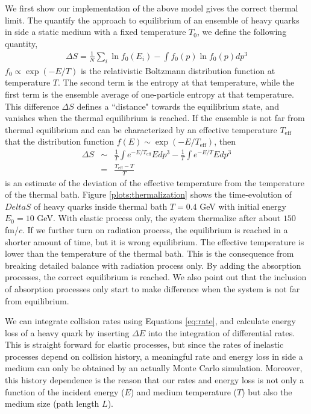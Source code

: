 \documentclass[aps, prc, reprint, amsmath, groupedaddress, nofootinbib]{revtex4-1}
\begin{document}
We first show our implementation of the above model gives the correct thermal limit. 
The quantify the approach to equilibrium of an ensemble of heavy quarks in side a static medium with a fixed temperature $T_0$, we define the following quantity,
\begin{eqnarray}
\Delta S = \frac{1}{N}\sum_i \ln f_0(E_i) - \int f_0(p)\ln f_0(p) dp^3
\end{eqnarray}
$f_0 \propto \exp(-E/T)$ is the relativistic Boltzmann distribution function at temperature $T$. 
The second term is the entropy at that temperature, while the first term is the ensemble average of one-particle entropy at that temperature.
This difference $\Delta S$ defines a ``distance" towards the equilibrium state, and vanishes when the thermal equilibrium is reached.
If the ensemble is not far from thermal equilibrium and can be characterized by an effective temperature $T_{\textrm{eff}}$ that the distribution function $f(E)\sim \exp(-E/T_{\textrm{eff}})$, then
\begin{eqnarray}
\nonumber
\Delta S &\sim& \frac{1}{T}\int  e^{-E/T_{\textrm{eff}}} E dp^3 - \frac{1}{T}\int e^{-E/T} E dp^3 \\
&=& \frac{T_\textrm{eff}-T}{T}
\end{eqnarray}
is an estimate of the deviation of the effective temperature from the temperature of the thermal bath.
Figure \ref{plots:thermalization} shows the time-evolution of $Delta S$ of heavy quarks inside thermal bath $T=0.4$ GeV with initial energy $E_0 = 10$ GeV.
With elastic process only, the system thermalize after about $150$ fm/$c$.
If we further turn on radiation process, the equilibrium is reached in a shorter amount of time, but it is wrong equilibrium.
The effective temperature is lower than the temperature of the thermal bath.
This is the consequence from breaking detailed balance with radiation process only.
By adding the absorption processes, the correct equilibrium is reached.
We also point out that the inclusion of absorption processes only start to make difference when the system is not far from equilibrium.

We can integrate collision rates using Equations \ref{eq:rate}, and calculate energy loss of a heavy quark by inserting $\Delta E$ into the integration of differential rates.
This is straight forward for elastic processes, but since the rates of inelastic processes depend on collision history, a meaningful rate and energy loss in side a medium can only be obtained by an actually Monte Carlo simulation.
Moreover, this history dependence is the reason that our rates and energy loss is not only a function of the incident energy ($E$) and medium temperature ($T$) but also the medium size (path length $L$).
\end{document}
